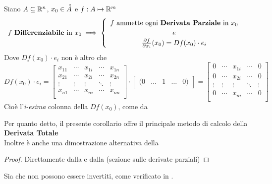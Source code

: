 \begin{corollary}
	\label{coro:se_diff_deriv_parz}
	Siano $A \subseteq \mathbb{R}^n$, $x_0 \in \accentset{\circ}{A}$ e $f:A \mapsto \mathbb{R}^m$
	\[
		f \text{ \textbf{Differenziabile} in } x_0
		\implies
		\begin{cases}
			\begin{array}{c}
				f \text{ ammette ogni \textbf{Derivata Parziale} in } x_0\\
				e\\
				\frac{\partial f}{\partial x_i}(x_0) = Df(x_0) \cdot e_i
			\end{array}
		\end{cases}
	\]
	Dove $Df(x_0) \cdot e_i$ non è altro che
	\[
		Df(x_0) \cdot e_i =
		\begin{bmatrix}
			x_{11} & \cdots & x_{1i} & \cdots & x_{1n}\\
			x_{21} & \cdots & x_{2i} & \cdots & x_{2n}\\
			\vdots & \vdots & \vdots & \ddots & \vdots\\
			x_{n1} & \cdots & x_{ni} & \cdots & x_{nn}\\
		\end{bmatrix}
		\cdot
		\begin{bmatrix}
			(0 & \dots & 1 & \dots & 0)
		\end{bmatrix}
		=
		\begin{bmatrix}
			0 & \cdots & x_{1i} & \cdots & 0\\
			0 & \cdots & x_{2i} & \cdots & 0\\
			\vdots & \vdots & \vdots & \ddots & \vdots\\
			0 & \cdots & x_{ni} & \cdots & 0\\
		\end{bmatrix}
	\]
	Cioè l'\textit{i-esima} colonna della $Df(x_0)$, come da 
	\begin{note}
		Per quanto detto, il presente corollario offre il principale metodo di calcolo della \textbf{Derivata Totale}\\
		Inoltre è anche una dimostrazione alternativa della 
	\end{note}
	\begin{proof}
		Direttamente dalla  e dalla  (sezione sulle derivate parziali)
	\end{proof}
\end{corollary}
\begin{observation}
	Sia  che  non possono essere invertiti, come verificato in .
\end{observation}
